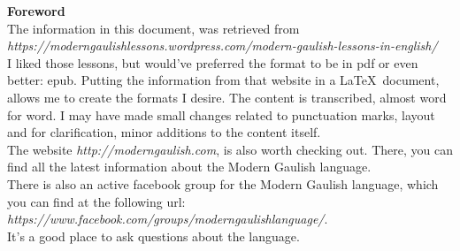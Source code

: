\begin{center}
\textbf{Foreword}\\
\bigskip
The information in this document, was retrieved from \textit{https://moderngaulishlessons.wordpress.com/modern-gaulish-lessons-in-english/}\\
\bigskip
I liked those lessons, but would've preferred the format to be in pdf or even better: epub. Putting the information from that website in a \LaTeX\ document, allows me to create the formats I desire. The content is transcribed, almost word for word. I may have made small changes related to punctuation marks, layout and for clarification, minor additions to the content itself.\\
\bigskip
The website \textit{http://moderngaulish.com}, is also worth checking out. There, you can find all the latest information about the Modern Gaulish language.\\
\bigskip
There is also an active facebook group for the Modern Gaulish language, which you can find at the following url: \textit{https://www.facebook.com/groups/moderngaulishlanguage/}.\\It's a good place to ask questions about the language.
\end{center}

